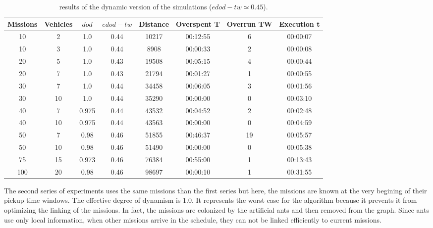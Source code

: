 \documentclass[a4paper,10pt]{article}
\begin{document}
  \small
\begin{table}[h]
  \begin{center}
    \begin{tabular}{|c|c|c|c|c|c|c|c|} 
    \hline
    \bf{Missions} & \bf{Vehicles} & \bf{$dod$} & \bf{$edod-tw$} & \bf{Distance} & \bf{Overspent T} & \bf{Overrun TW} &  \bf{Execution t} \\ \hline
    10	 & 2 	& 1.0	& 0.44	& 10217	& 00:12:55	& 6	& 00:00:07\\
    10	 & 3 	& 1.0	& 0.44	& 8908	& 00:00:33	& 2	& 00:00:08\\
    20	 & 5 	& 1.0	& 0.43	& 19508	& 00:05:15	& 4	& 00:00:44\\
    20	 & 7 	& 1.0	& 0.43	& 21794	& 00:01:27	& 1	& 00:00:55\\
    30	 & 7 	& 1.0	& 0.44	& 34458	& 00:06:05	& 3	& 00:01:56\\
    30	 & 10 	& 1.0	& 0.44	& 35290	& 00:00:00	& 0	& 00:03:10\\
    40	 & 7 	& 0.975	& 0.44	& 43532	& 00:04:52	& 2	& 00:02:48\\
    40	 & 10 	& 0.975	& 0.44	& 43563	& 00:00:00	& 0	& 00:04:59\\
    50	 & 7 	& 0.98	& 0.46	& 51855	& 00:46:37	& 19	& 00:05:57\\
    50	 & 10 	& 0.98	& 0.46	& 51490	& 00:00:00	& 0	& 00:05:38\\
    75	 & 15 	& 0.973	& 0.46	& 76384	& 00:55:00	& 1	& 00:13:43\\
    100	 & 20 	& 0.98	& 0.46	& 98697	& 00:00:10	& 1	& 00:31:55\\
    \hline
    \end{tabular}
  \caption{results of the dynamic version of the simulations ($edod-tw \simeq 0.45$).}
  \end{center}
\end{table}

  \normalsize

  The second series of experiments uses the same missions than the first series but here, the missions are known at the very begining of their pickup time windows. The effective degree of dynamism is $1.0$. It represents the worst case for the algorithm because it prevents it from optimizing the linking of the missions. In fact, the missions are colonized by the artificial ants and then removed from the graph. Since ants use only local information, when other missions arrive in the schedule, they can not be linked efficiently to current missions.
\end{document}
